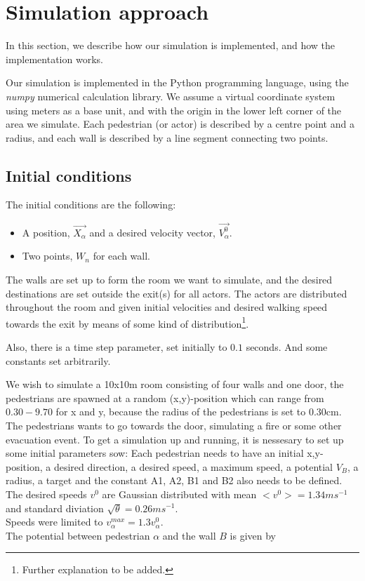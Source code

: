 \section{Simulation approach}
\label{sec:simulation}
In this section, we describe how our simulation is implemented, and how the 
implementation works.

Our simulation is implemented in the Python programming language, using the 
\emph{numpy} numerical calculation library. We assume a virtual coordinate 
system using meters as a base unit, and with the origin in the lower left 
corner of the area we simulate. Each pedestrian (or actor) is described by a 
centre point and a radius, and each wall is described by a line segment 
connecting two points.

\subsection{Initial conditions}
The initial conditions are the following:

\begin{itemize}
    \item A position, $\vec{X_{\alpha}}$ and a desired velocity vector, $\vec{V^{0}_{\alpha}}$.
    \item Two points, $W_n$ for each wall.
\end{itemize}

The walls are set up to form the room we want to simulate, and the desired 
destinations are set outside the exit(s) for all actors. The actors are 
distributed throughout the room and given initial velocities and desired 
walking speed towards the exit by means of some kind of 
distribution\footnote{Further explanation to be added.}.

Also, there is a time step parameter, set initially to $0.1$ seconds. And some 
constants set arbitrarily.

We wish to simulate a 10x10m room consisting of four walls and one door, the pedestrians 
are spawned at a random (x,y)-position which can range from $0.30 - 9.70$ for x and y, 
because the radius of the pedestrians is set to $0.30$cm. The pedestrians wants to go 
towards the door, simulating a fire or some other evacuation event. To get a simulation 
up and running, it is nessesary to set up some initial parameters sow: Each pedestrian 
needs to have an initial x,y-position, a desired direction, a desired speed, a maximum 
speed, a potential $V_B$, a radius, a target and the constant A1, A2, B1 and B2 also needs 
to be defined.\\
The desired speeds $v^0$ are Gaussian distributed with mean $<v^0> = 1.34ms^{-1}$ and standard 
diviation $\sqrt{\theta} = 0.26ms^{-1}$.\\
Speeds were limited to $v_\alpha^{max}=1.3 v_\alpha^0$.\\
The potential between pedestrian $\alpha$ and the wall $B$ is given by 

